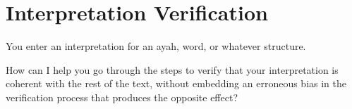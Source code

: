 \documentclass[12pt,a4paper]{article}
\begin{document}
\section{Interpretation Verification}\label{interpretation-verification}

You enter an interpretation for an ayah, word, or whatever structure.

How can I help you go through the steps to verify that your
interpretation is coherent with the rest of the text, without embedding
an erroneous bias in the verification process that produces the opposite
effect?
\end{document}
